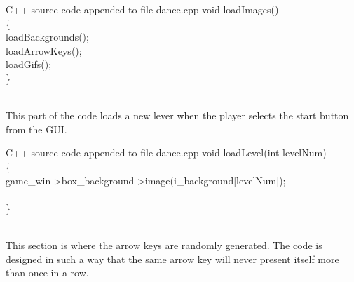 \documentclass {article}
\begin{document}
\clearpage
\begin{GFT}{C++ source code appended to file dance.cpp}
\+void loadImages()\\
\+\{\\
\+	loadBackgrounds();\\
\+	loadArrowKeys();\\
\+	loadGifs();\\
\+\}\\
\+\\
\end{GFT}
This part of the code loads a new lever when the player selects the start button from the GUI.

\begin{GFT}{C++ source code appended to file dance.cpp}
\+void loadLevel(int levelNum)\\
\+\{\\
\+	game\_win->box\_background->image(i\_background[levelNum]);\\
\+	\\
\+\}\\
\+\\
\end{GFT}
\clearpage
This section is where the arrow keys are randomly generated. The code is designed in such a way that the same arrow key will never present itself more than once in a row.
\end{document}
